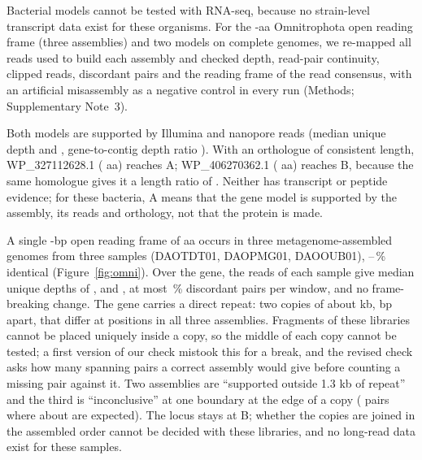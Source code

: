 \documentclass[11pt]{article}
\begin{document}
Bacterial models cannot be tested with RNA-seq, because no strain-level transcript data exist for these organisms. For
the -aa Omnitrophota open reading frame (three assemblies) and two  models on complete
genomes, we re-mapped all reads used to build each assembly and checked depth, read-pair continuity, clipped reads,
discordant pairs and the reading frame of the read consensus, with an artificial misassembly as a negative control in
every run (Methods; Supplementary Note~3).

Both  models are supported by Illumina and nanopore reads (median unique depth  and
, gene-to-contig depth ratio ). With an orthologue of consistent length,
WP\_327112628.1 ( aa) reaches A; WP\_406270362.1 ( aa) reaches B, because the same
homologue gives it a length ratio of . Neither has transcript or peptide evidence; for these bacteria,
A means that the gene model is supported by the assembly, its reads and orthology, not that the protein is made.

A single -bp open reading frame of  aa occurs in three metagenome-assembled genomes from three
samples (DAOTDT01, DAOPMG01, DAOOUB01), --\,\% identical
(Figure~\ref{fig:omni}). Over the gene, the reads of each sample give median unique depths of ,
 and , at most \,\% discordant pairs per window, and no
frame-breaking change. The gene carries a direct repeat: two copies of about  kb,
 bp apart, that differ at  positions in all three assemblies. Fragments of these libraries
cannot be placed uniquely inside a copy, so the middle of each copy cannot be tested; a first version of our check
mistook this for a break, and the revised check asks how many spanning pairs a correct assembly would give before
counting a missing pair against it. Two assemblies are ``supported outside 1.3 kb of repeat'' and the third is
``inconclusive'' at one boundary at the edge of a copy ( pairs where about
 are expected). The locus stays at B; whether the copies are joined in the assembled order cannot be
decided with these libraries, and no long-read data exist for these samples.
\end{document}
